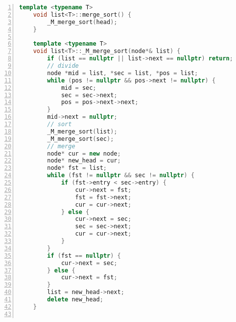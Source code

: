 \documentclass{article}
\begin{document}
\begin{lstlisting}[xleftmargin = 2em,xrightmargin = 2em, aboveskip = 0.5em, numbers = left, language = C++]
    template <typename T>
    void list<T>::merge_sort() {
        _M_merge_sort(head);
    }

    template <typename T>
    void list<T>::_M_merge_sort(node*& list) {
        if (list == nullptr || list->next == nullptr) return;
        // divide
        node *mid = list, *sec = list, *pos = list;
        while (pos != nullptr && pos->next != nullptr) {
            mid = sec;
            sec = sec->next;
            pos = pos->next->next;
        }
        mid->next = nullptr;
        // sort
        _M_merge_sort(list);
        _M_merge_sort(sec);
        // merge
        node* cur = new node;
        node* new_head = cur;
        node* fst = list;
        while (fst != nullptr && sec != nullptr) {
            if (fst->entry < sec->entry) {
                cur->next = fst;
                fst = fst->next;
                cur = cur->next;
            } else {
                cur->next = sec;
                sec = sec->next;
                cur = cur->next;
            }
        }
        if (fst == nullptr) {
            cur->next = sec;
        } else {
            cur->next = fst;
        }
        list = new_head->next;
        delete new_head;
    }


\end{lstlisting}
\end{document}
